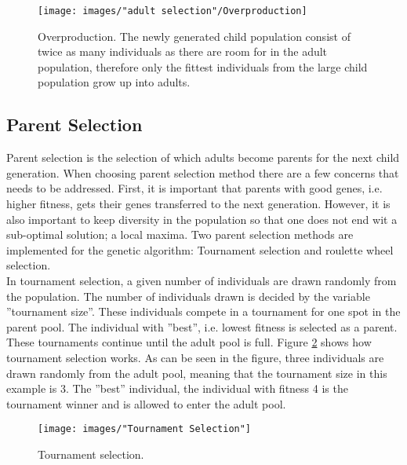 \documentclass{article}
\begin{document}
\begin{figure}[h!]
\begin{center}
\texttt{[image: images/"adult selection"/Overproduction]}
\caption{Overproduction. The newly generated child population consist of twice as many individuals as there are room for in the adult population, therefore only the fittest individuals from the large child population grow up into adults.}
\label{figure:overproduction}
\end{center}
\end{figure}



\subsection{Parent Selection}\label{subsection:parent selection}
Parent selection is the selection of which adults become parents for the next child generation. When choosing parent selection method there are a few concerns that needs to be addressed. First, it is important that parents with good genes, i.e. higher fitness, gets their genes transferred to the next generation. However, it is also important to keep diversity in the population so that one does not end wit a sub-optimal solution; a local maxima. Two parent selection methods are implemented for the genetic algorithm: Tournament selection and roulette wheel selection. \\

\noindent In tournament selection, a given number of individuals are drawn randomly from the population. The number of individuals drawn is decided by the variable ''tournament size''. These individuals compete in a tournament for one spot in the parent pool. The individual with ''best'', i.e. lowest fitness is selected as a parent. These tournaments continue until the adult pool is full. Figure \ref{figure:tournament selection} shows how tournament selection works. As can be seen in the figure, three individuals are drawn randomly from the adult pool, meaning that the tournament size in this example is 3. The ''best'' individual, the individual with fitness 4 is the tournament winner and is allowed to enter the adult pool. \\


\begin{figure}[h!]
\begin{center}
\texttt{[image: images/"Tournament Selection"]}
\caption{Tournament selection.}
\label{figure:tournament selection}
\end{center}
\end{figure}
\end{document}
